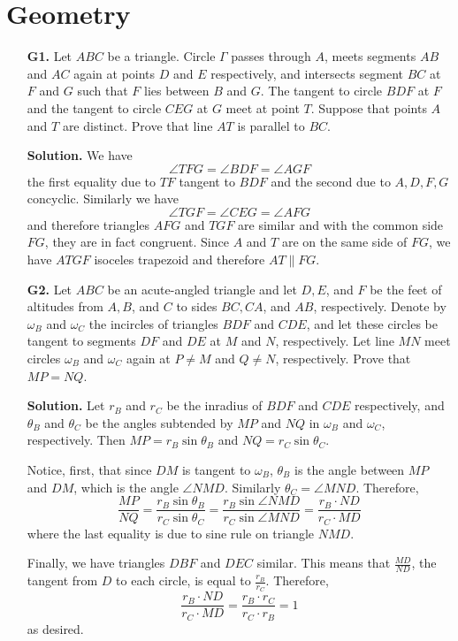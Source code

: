 \documentclass[11pt,a4paper]{article}
\begin{document}
\section*{Geometry}
\begin{enumerate}
	\item [\textbf{G1.}] Let $ABC$ be a triangle. Circle $\Gamma$ passes through $A$, meets segments $AB$ and $AC$ again at points $D$ and $E$ respectively, and intersects segment $BC$ at $F$ and $G$ such that $F$ lies between $B$ and $G$. The tangent to circle $BDF$ at $F$ and the tangent to circle $CEG$ at $G$ meet at point $T$. Suppose that points $A$ and $T$ are distinct. Prove that line $AT$ is parallel to $BC$.
	
	\textbf{Solution.} We have 
	\[
	\angle TFG =\angle BDF = \angle AGF
	\]
	the first equality due to $TF$ tangent to $BDF$ and the second due to $A, D, F, G$ concyclic. Similarly we have 
	\[
	\angle TGF = \angle CEG = \angle AFG
	\]
	and therefore triangles $AFG$ and $TGF$ are similar and with the common side $FG$, they are in fact congruent. Since $A$ and $T$ are on the same side of $FG$, we have $ATGF$ isoceles trapezoid and therefore $AT\parallel FG$. 
	
	
	\item [\textbf{G2.}] Let $ABC$ be an acute-angled triangle and let $D, E$, and $F$ be the feet of altitudes from $A, B$, and $C$ to sides $BC, CA$, and $AB$, respectively. Denote by $\omega_B$ and $\omega_C$ the incircles of triangles $BDF$ and $CDE$, and let these circles be tangent to segments $DF$ and $DE$ at $M$ and $N$, respectively. Let line $MN$ meet circles $\omega_B$ and $\omega_C$ again at $P \ne M$ and $Q \ne N$, respectively. Prove that $MP = NQ$.
	
	\textbf{Solution.} Let $r_B$ and $r_C$ be the inradius of $BDF$ and $CDE$ respectively, and $\theta_B$ and $\theta_C$ be the angles subtended by $MP$ and $NQ$ in $\omega_B$ and $\omega_C$, respectively. Then $MP=r_B\sin \theta_B$ and $NQ=r_C\sin\theta_C$. 
	
	Notice, first, that since $DM$ is tangent to $\omega_B$, $\theta_B$ is the angle between $MP$ and $DM$, which is the angle $\angle NMD$. Similarly $\theta_C=\angle MND$. Therefore, 
	\[
	\frac{MP}{NQ}=\frac{r_B\sin \theta_B}{r_C\sin\theta_C}
	=\frac{r_B\sin \angle NMD}{r_C\sin\angle MND}
	=\frac{r_B\cdot ND}{r_C\cdot MD}
	\]
	where the last equality is due to sine rule on triangle $NMD$. 
	
	Finally, we have triangles $DBF$ and $DEC$ similar. This means that $\frac{MD}{ND}$, the tangent from $D$ to each circle, is equal to $\frac{r_B}{r_C}$. Therefore, 
	\[
	\frac{r_B\cdot ND}{r_C\cdot MD} = \frac{r_B\cdot r_C}{r_C\cdot r_B} = 1
	\]
	as desired. 
	

\end{enumerate}
\end{document}
